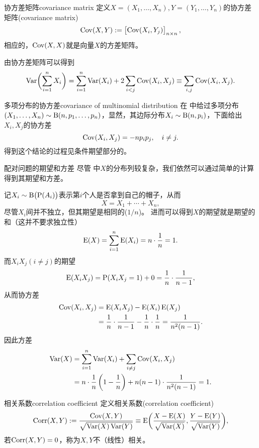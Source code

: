 \begin{definition}{协方差矩阵}{covariance matrix}
	定义$X=(X_1,\ldots,X_n),Y=(Y_1,\ldots,Y_n)$的协方差矩阵(covariance matrix)
	\begin{align}
		\operatorname{Cov}(X,Y):=\begin{bmatrix}
			\operatorname{Cov}(X_i,Y_j)
		\end{bmatrix}_{n\times n},
	\end{align}
	相应的，$\operatorname{Cov}(X,X)$就是向量$X$的方差矩阵。
\end{definition}
由协方差矩阵可以得到
\begin{align}
	\operatorname{Var}\biggl(\sum_{i=1}^nX_i\biggr)=\sum_{i=1}^n\operatorname{Var}(X_i)+2\sum_{i<j}\operatorname{Cov}(X_i,X_j)\equiv\sum_{i,j}\operatorname{Cov}(X_i,X_j).
\end{align}
\begin{example}{多项分布的协方差}{covariance of multinomial distribution}
	在 中给过多项分布$(X_1,\ldots,X_n)\sim\operatorname{B}(n,p_1,\ldots,p_n)$，显然，其边际分布$X_i\sim\operatorname{B}(n,p_i)$，下面给出$X_i,X_j$的协方差
	\[
		\operatorname{Cov}(X_i,X_j)=-np_ip_j,\quad i\neq j.
	\]
	得到这个结论的过程见条件期望部分的。
\end{example}
\begin{example}{配对问题的期望和方差}{}
	尽管 中$X$的分布列较复杂，我们依然可以通过简单的计算得到其期望和方差。
	
	记$X_i\sim\operatorname{B}\bigl(\operatorname{P}(A_i)\bigr)$表示第$i$个人是否拿到自己的帽子，从而
	\[
		X=X_1+\cdots+X_n,
	\]
	尽管$X_i$间并不独立，但其期望是相同的($1/n$)。
	进而可以得到$X$的期望就是期望的和（这并不要求独立性）
	\[
		\operatorname{E}(X)=\sum_{i=1}^n\operatorname{E}(X_i)=n\cdot\frac1n=1.
	\]
	而$X_iX_j(i\neq j)$的期望
	\[
		\operatorname{E}(X_iX_j)=\operatorname{P}(X_iX_j=1)+0=\frac1n\cdot\frac1{n-1},
	\]
	从而协方差
	\begin{align*}
		\operatorname{Cov}(X_i,X_j)&=\operatorname{E}(X_iX_j)-\operatorname{E}(X_i)\operatorname{E}(X_j)\\
		&=\frac1n\cdot\frac1{n-1}-\frac1n\cdot\frac1n=\frac1{n^2(n-1)}.
	\end{align*}
	因此方差
	\begin{align*}
		\operatorname{Var}(X)&=\sum_{i=1}^n\operatorname{Var}(X_i)+\sum_{i\neq j}\operatorname{Cov}(X_i,X_j)\\
		&=n\cdot\frac1n\left(1-\frac1n\right)+n(n-1)\cdot\frac1{n^2(n-1)}=1.
	\end{align*}
\end{example}
\begin{definition}{相关系数}{correlation coefficient}
	定义相关系数(correlation coefficient)
	\begin{align}
		\operatorname{Corr}(X,Y):=\frac{\operatorname{Cov}(X,Y)}{\sqrt{\operatorname{Var}(X)\operatorname{Var}(Y)}}\equiv\operatorname{E}\biggl(\frac{X-\operatorname{E}(X)}{\sqrt{\operatorname{Var}(X)}},\frac{Y-\operatorname{E}(Y)}{\sqrt{\operatorname{Var}(Y)}}\biggr),
	\end{align}
	若$\operatorname{Corr}(X,Y)=0$，称为$X,Y$不（线性）相关。
\end{definition}
